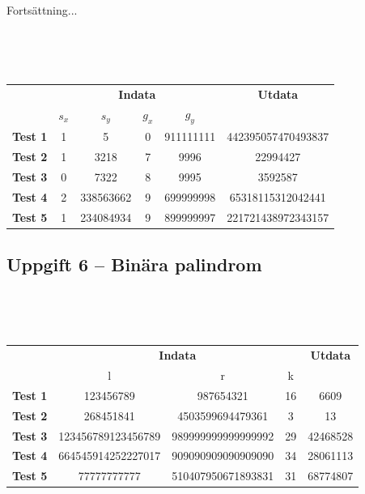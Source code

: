 \documentclass[a4paper,12pt,oneside]{amsbook}
\theoremstyle{test}
\newcommand{\fe}[1]{\textbf{#1}}            %
\begin{document}
\vspace{0.1cm}

Fortsättning...

~\\
{\tt 
\begin{tabular}{||l||c|c|c|c||c||}\hline\hline
& \multicolumn{4}{c||}{\fe{Indata}} & \multicolumn{1}{c||}{\fe{Utdata}} \\ 
& $s_x$ & $s_y$ & $g_x$ & $g_y$ &  \\ \hline \hline
\fe{Test 1} & 1 & 5 & 0 & 911111111 & 442395057470493837 \\ \hline
\fe{Test 2} & 1 & 3218 & 7 & 9996 & 22994427 \\ \hline
\fe{Test 3} & 0 & 7322 & 8 & 9995 & 3592587 \\ \hline
\fe{Test 4} & 2 & 338563662 & 9 & 699999998 & 65318115312042441 \\ \hline
\fe{Test 5} & 1 & 234084934 & 9 & 899999997 & 221721438972343157 \\ \hline
\end{tabular}
}

\vspace{1cm}

\subsection*{Uppgift 6 -- Binära palindrom}

~\\
{\tt 
\begin{tabular}{||l||c|c|c||c||} \hline\hline
  & \multicolumn{3}{c||}{\fe{Indata}} & \fe{Utdata} \\ 
  & l & r & k &  \\ \hline \hline
  \fe{Test 1} & 123456789 & 987654321 & 16 & 6609 \\ \hline
  \fe{Test 2} & 268451841 & 4503599694479361 & 3 & 13 \\ \hline
  \fe{Test 3} & 123456789123456789 & 989999999999999992 & 29 & 42468528 \\ \hline
  \fe{Test 4} & 664545914252227017 & 909090909090909090 & 34 & 28061113 \\ \hline
  \fe{Test 5} & 77777777777 & 510407950671893831 & 31 & 68774807 \\ \hline

\end{tabular}  
}
\vspace{1cm}
\end{document}
